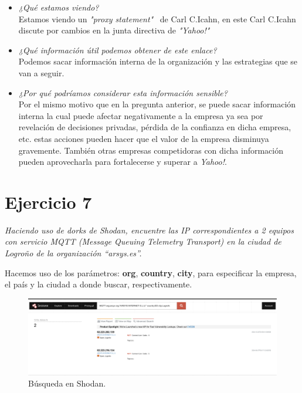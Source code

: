 \documentclass[12pt]{book}
\begin{document}
\begin{itemize}
    \item \textit{¿Qué estamos viendo?}\\
        Estamos viendo un \textit{"proxy statement"}~\cite{ProxyStatement} de Carl C.Icahn, en este Carl C.Icahn discute por cambios en la junta directiva de \textit{"Yahoo!"}
        
    \item \textit{¿Qué información útil podemos obtener de este enlace?}\\
        Podemos sacar información interna de la organización y las estrategias que se van a seguir.
    \item \textit{¿Por qué podríamos considerar esta información sensible?}\\
        Por el mismo motivo que en la pregunta anterior, se puede sacar información interna la cual puede afectar negativamente a la empresa ya sea por revelación de decisiones privadas, pérdida de la confianza en dicha empresa, etc. estas acciones pueden hacer que el valor de la empresa disminuya gravemente. También otras empresas competidoras con dicha información pueden aprovecharla para fortalecerse y superar a \textit{Yahoo!}.        
\end{itemize}
\newpage
\section{Ejercicio 7}
\textit{Haciendo uso de dorks de Shodan, encuentre las IP correspondientes a 2 equipos con servicio MQTT (Message Queuing Telemetry Transport) en la ciudad de Logroño de la organización “arsys.es”.}

Hacemos uso de los parámetros: \textbf{org}, \textbf{country}, \textbf{city}, para especificar la empresa, el país y la ciudad a donde buscar, respectivamente.
\begin{figure}[h]
    \centering
    \includegraphics[width=\linewidth]{Practica 3y4/images/Screenshot 2024-10-24 at 10.28.43.png}
    \caption{Búsqueda en Shodan.}
    \label{fig:enter-label}
\end{figure}
\newpage
\end{document}
